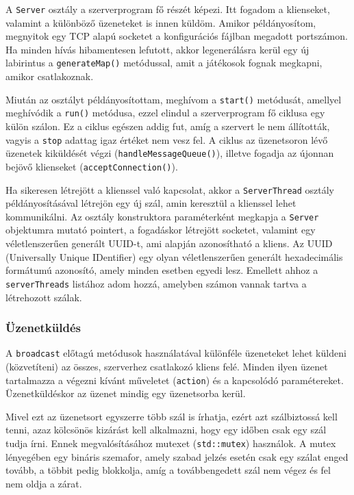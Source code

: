 A \verb|Server| osztály a szerverprogram fő részét képezi. Itt fogadom a klienseket, valamint a különböző üzeneteket is innen küldöm. Amikor példányosítom, megnyitok egy TCP alapú socketet a konfigurációs fájlban megadott portszámon. Ha minden hívás hibamentesen lefutott, akkor legenerálásra kerül egy új labirintus a \verb|generateMap()| metódussal, amit a játékosok fognak megkapni, amikor csatlakoznak.

Miután az osztályt példányosítottam, meghívom a \verb|start()| metódusát, amellyel meghívódik a \verb|run()| metódusa, ezzel elindul a szerverprogram fő ciklusa egy külön szálon. Ez a ciklus egészen addig fut, amíg a szervert le nem állították, vagyis a \verb|stop| adattag igaz értéket nem vesz fel. A ciklus az üzenetsoron lévő üzenetek kiküldését végzi (\verb|handleMessageQueue()|), illetve fogadja az újonnan bejövő klienseket (\verb|acceptConnection()|).

Ha sikeresen létrejött a klienssel való kapcsolat, akkor a \verb|ServerThread| osztály példányosításával létrejön egy új szál, amin keresztül a klienssel lehet kommunikálni. Az osztály konstruktora paraméterként megkapja a \verb|Server| objektumra mutató pointert, a fogadáskor létrejött socketet, valamint egy véletlenszerűen generált UUID-t, ami alapján azonosítható a kliens. Az UUID (Universally Unique IDentifier) egy olyan véletlenszerűen generált hexadecimális formátumú azonosító, amely minden esetben egyedi lesz. Emellett ahhoz a \verb|serverThreads| listához adom hozzá, amelyben számon vannak tartva a létrehozott szálak.

\subsubsection{Üzenetküldés}

A \verb|broadcast| előtagú metódusok használatával különféle üzeneteket lehet küldeni (közvetíteni) az összes, szerverhez csatlakozó kliens felé. Minden ilyen üzenet tartalmazza a végezni kívánt műveletet (\verb|action|) és a kapcsolódó paramétereket. Üzenetküldéskor az üzenet mindig egy üzenetsorba kerül.

Mivel ezt az üzenetsort egyszerre több szál is írhatja, ezért azt szálbiztossá kell tenni, azaz kölcsönös kizárást kell alkalmazni, hogy egy időben csak egy szál tudja írni. Ennek megvalósításához mutexet (\verb|std::mutex|) használok. A mutex lényegében egy bináris szemafor, amely szabad jelzés esetén csak egy szálat enged tovább, a többit pedig blokkolja, amíg a továbbengedett szál nem végez és fel nem oldja a zárat.

